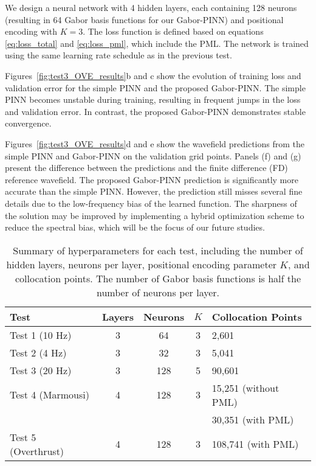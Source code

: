 \documentclass[authoryear, preprint, 12pt]{elsarticle}
\begin{document}
	We design a neural network with 4 hidden layers, each containing 128 neurons (resulting in 64 Gabor basis functions for our Gabor-PINN) and positional encoding with \( K = 3 \). The loss function is defined based on equations \eqref{eq:loss_total} and \eqref{eq:loss_pml}, which include the PML. The network is trained using the same learning rate schedule as in the previous test.  
	
	Figures~\ref{fig:test3_OVE_results}b and c show the evolution of training loss and validation error for the simple PINN and the proposed Gabor-PINN. The simple PINN becomes unstable during training, resulting in frequent jumps in the loss and validation error. In contrast, the proposed Gabor-PINN demonstrates stable convergence.  
	
	Figures~\ref{fig:test3_OVE_results}d and e show the wavefield predictions from the simple PINN and Gabor-PINN on the validation grid points. Panels (f) and (g) present the difference between the predictions and the finite difference (FD) reference wavefield. The proposed Gabor-PINN prediction is significantly more accurate than the simple PINN. However, the prediction still misses several fine details due to the low-frequency bias of the learned function. The sharpness of the solution may be improved by implementing a hybrid optimization scheme to reduce the spectral bias, which will be the focus of our future studies.  
\begin{table}[h]
	\centering
	\renewcommand{\arraystretch}{1.2} %
	\begin{tabular}{lccc p{4cm}} 
		\toprule
		\textbf{Test} & \textbf{Layers} & \textbf{Neurons} & \textbf{\( K \)} & \textbf{Collocation Points} \\ 
		\midrule
		Test 1 (10 Hz) & 3 & 64 & 3 & 2,601 \\ 
		Test 2 (4 Hz) & 3 & 32 & 3 & 5,041 \\ 
		Test 3 (20 Hz) & 3 & 128 & 5 & 90,601 \\ 
		Test 4 (Marmousi) & 4 & 128 & 3 & 15,251 (without PML) \\ 
		&   &     &   & 30,351 (with PML) \\  
		Test 5 (Overthrust) & 4 & 128 & 3 & 108,741 (with PML) \\  
		\bottomrule
	\end{tabular}
	\caption{Summary of hyperparameters for each test, including the number of hidden layers, neurons per layer, positional encoding parameter \( K \), and collocation points. The number of Gabor basis functions is half the number of neurons per layer.}
	\label{tab:hyperparameters}
\end{table}
\end{document}
